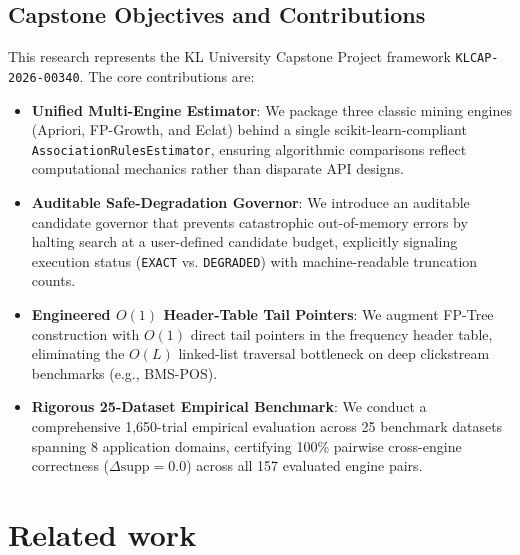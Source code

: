 \documentclass[twocolumn,10pt]{article}
\begin{document}
\subsection{Capstone Objectives and Contributions}
This research represents the KL University Capstone Project framework \texttt{KLCAP-2026-00340}. The core contributions are:
\begin{itemize}
  \item \textbf{Unified Multi-Engine Estimator}: We package three classic mining engines (Apriori, FP-Growth, and Eclat) behind a single scikit-learn-compliant \texttt{AssociationRulesEstimator}, ensuring algorithmic comparisons reflect computational mechanics rather than disparate API designs.
  \item \textbf{Auditable Safe-Degradation Governor}: We introduce an auditable candidate governor that prevents catastrophic out-of-memory errors by halting search at a user-defined candidate budget, explicitly signaling execution status (\texttt{EXACT} vs. \texttt{DEGRADED}) with machine-readable truncation counts.
  \item \textbf{Engineered $O(1)$ Header-Table Tail Pointers}: We augment FP-Tree construction with $O(1)$ direct tail pointers in the frequency header table, eliminating the $O(L)$ linked-list traversal bottleneck on deep clickstream benchmarks (e.g., BMS-POS).
  \item \textbf{Rigorous 25-Dataset Empirical Benchmark}: We conduct a comprehensive 1,650-trial empirical evaluation across 25 benchmark datasets spanning 8 application domains, certifying 100\% pairwise cross-engine correctness ($\Delta\mathrm{supp} = 0.0$) across all 157 evaluated engine pairs.
\end{itemize}

\section{Related work}
\label{sec:related}
\end{document}
